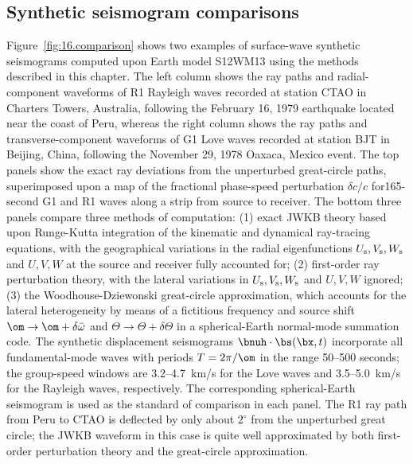 \subsection{Synthetic seismogram comparisons}
%
%
\renewcommand{\thesubsection}{\arabic{chapter}.\arabic{section}.\arabic{subsection}}

Figure~\ref{fig:16.comparison} shows two examples
of surface-wave synthetic seismograms computed upon
Earth model S12WM13 using the methods described in
this chapter.  The left column shows the ray paths and
radial-component waveforms of R1 Rayleigh waves recorded at station
CTAO in Charters Towers, Australia, following the February 16, 1979
earthquake located near the coast of Peru,
%
whereas the right column shows
the ray paths and transverse-component waveforms of G1 Love waves recorded
at station BJT in Beijing, China, following the November 29, 1978
Oaxaca, Mexico event.
%
The top panels show the exact ray deviations
from the unperturbed great-circle paths, superimposed upon a map of the
fractional phase-speed perturbation $\delta c/c$
for165-second G1 and R1 waves along a strip from source to receiver.
The bottom three panels compare three methods of computation:
(1) exact JWKB theory based
upon Runge-Kutta integration of the kinematic and dynamical
ray-tracing equations, with the geographical variations
in the radial eigenfunctions $U_{\rm s},V_{\rm s},W_{\rm s}$
and $U,V,W$ at the source and receiver fully accounted for;
(2) first-order ray perturbation theory, with the lateral
variations in $U_{\rm s},V_{\rm s},W_{\rm s}$ and $U,V,W$
ignored; (3) the Woodhouse-Dziewonski great-circle approximation,
which accounts for the lateral heterogeneity by means of a fictitious
frequency and source shift $\om\rightarrow\om+\delta\bar{\omega}$
and $\Theta\rightarrow\Theta+\delta\Theta$ in a spherical-Earth
normal-mode summation code.  The synthetic displacement seismograms
$\bnuh\cdot\bs(\bx,t)$ incorporate all fundamental-mode waves with periods
$T=2\pi/\om$ in the range 50--500 seconds; the group-speed windows are
3.2--4.7~km/s for the Love waves and 3.5--5.0~km/s for the Rayleigh
waves, respectively.  The corresponding spherical-Earth seismogram
is used as the standard of comparison in each panel.
The R1 ray path from Peru to CTAO is 
deflected by only about $2^\circ$ from the unperturbed
great circle; the JWKB waveform in this case is quite
well approximated by both first-order perturbation
theory and the great-circle approximation.

